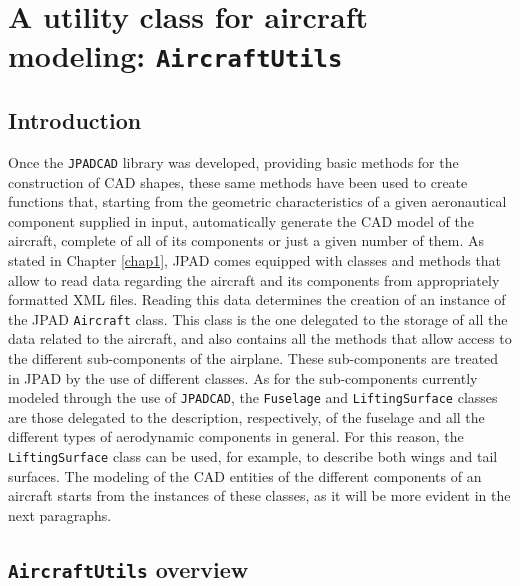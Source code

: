 \chapter{A utility class for aircraft modeling: \texttt{AircraftUtils}}
\label{chap3}

\section{Introduction}
\label{sec3.1}

Once the \lstinline[language=Java]!JPADCAD! library was developed, providing basic methods for the construction of \gls{CAD} shapes, these same methods have been used to create functions that, starting from the geometric characteristics of a given aeronautical component supplied in input, automatically generate the \gls{CAD} model of the aircraft, complete of all of its components or just a given number of them. As stated in Chapter \ref{chap1}, \gls{JPAD} comes equipped with classes and methods that allow to read data regarding the aircraft and its components from appropriately formatted XML files. Reading this data determines the creation of an instance of the \gls{JPAD} \lstinline[language=Java]!Aircraft! class. This class is the one delegated to the storage of all the data related to the aircraft, and also contains all the methods that allow access to the different sub-components of the airplane. These sub-components are treated in \gls{JPAD} by the use of different classes. As for the sub-components currently modeled through the use of \lstinline[language=Java]!JPADCAD!, the \lstinline[language=Java]!Fuselage! and \lstinline[language=Java]!LiftingSurface! classes are those delegated to the description, respectively, of the fuselage and all the different types of aerodynamic components in general. For this reason, the \lstinline[language=Java]!LiftingSurface! class can be used, for example, to describe both wings and tail surfaces. The modeling of the \gls{CAD} entities of the different components of an aircraft starts from the instances of these classes, as it will be more evident in the next paragraphs.

\section{\texttt{AircraftUtils} overview}
\label{sec3.2}

